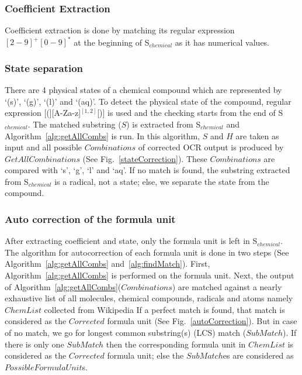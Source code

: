 \subsubsection{Coefficient Extraction}
Coefficient extraction is done by matching its regular expression $[2-9]^{+}[0-9]^{*}$ at the beginning of S$_{chemical}$ as it has numerical values. 
\subsubsection{State separation}
 There are 4 physical states of a chemical compound which are represented by `(s)', `(g)', `(l)' and `(aq)'. To detect the physical state of the compound,  regular expression [(][A-Za-z]$^{[1,2]}$[)] is used and the checking starts from the end of S$_{chemical}$. The matched substring ($S$) is extracted from  S$_{chemical}$ and Algorithm~\ref{alg:getAllCombs} is run. 
In this algorithm, $S$ and $H$  are taken as input and all possible $Combinations$ of corrected OCR output is produced by $GetAllCombinations$ (See Fig.~\ref{stateCorrection}). These $Combinations$ are compared with `s', `g', `l' and `aq'. If no match is found, the substring extracted from S$_{chemical}$ is a radical, not a state; else, we separate the state from the compound. 

\subsubsection{Auto correction of the formula unit}
After extracting coefficient and state, only the formula unit is left in S$_{chemical}$. 
The algorithm for autocorrection of each formula unit is done in two steps (See Algorithm~\ref{alg:getAllCombs} and~\ref{alg:findMatch}). First, Algorithm~\ref{alg:getAllCombs} is performed on the formula unit.
 Next, the output of Algorithm~\ref{alg:getAllCombs}($Combinations$) are matched against a nearly exhaustive list of all molecules, chemical compounds, radicals and atoms namely $ChemList$ collected from Wikipedia %
If a perfect match is found, that match is considered as the $Corrected$ formula unit (See Fig.~\ref{autoCorrection}). But in case of no match, we go for
longest common substring(s) (LCS) match ($SubMatch$).%
If there is only one $SubMatch$ then the corresponding formula unit in $ChemList$ is considered as the $Corrected$  formula unit; else the $SubMatch$es are considered as $PossibleFormulaUnit$s. 

